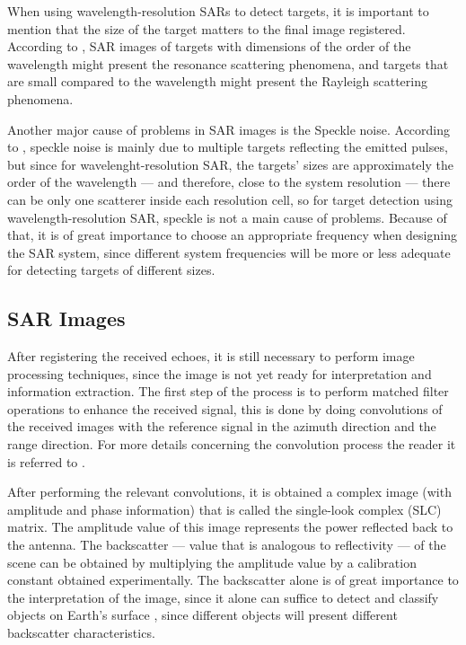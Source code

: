 When using wavelength-resolution SARs to detect targets, it is important to mention that the size of the target matters to the final image registered. According to \cite{63}, SAR images of targets with dimensions of the order of the wavelength might present the resonance scattering phenomena, and targets that are small compared to the wavelength might present the Rayleigh scattering phenomena.

Another major cause of problems in SAR images is the Speckle noise. According to \cite{63, 17}, speckle noise is mainly due to multiple targets reflecting the emitted pulses, but since for wavelenght-resolution SAR, the targets' sizes are approximately the order of the wavelength --- and therefore, close to the system resolution --- there can be only one scatterer inside each resolution cell, so for target detection using wavelength-resolution SAR, speckle is not a main cause of problems. Because of that, it is of great importance to choose an appropriate frequency when designing the SAR system, since different system frequencies will be more or less adequate for detecting targets of different sizes.

\subsection{SAR Images}
After registering the received echoes, it is still necessary to perform image processing techniques, since the image is not yet ready for interpretation and information extraction\cite{Alberto}. The first step of the process is to perform matched filter operations to enhance the received signal, this is done by doing convolutions of the received images with the reference signal in the azimuth direction and the range direction. For more details concerning the convolution process the reader it is referred to \cite{Alberto, livro}.

After performing the relevant convolutions, it is obtained a complex image (with amplitude and phase information) that is called the single-look complex (SLC) matrix. The amplitude value of this image represents the power reflected back to the antenna. The backscatter --- value that is analogous to reflectivity --- of the scene can be obtained by multiplying the amplitude value by a calibration constant obtained experimentally.
The backscatter alone is of great importance to the interpretation of the image, since it alone can suffice to detect and classify objects on Earth's surface \cite{radiometric}, since different objects will present different backscatter characteristics.


